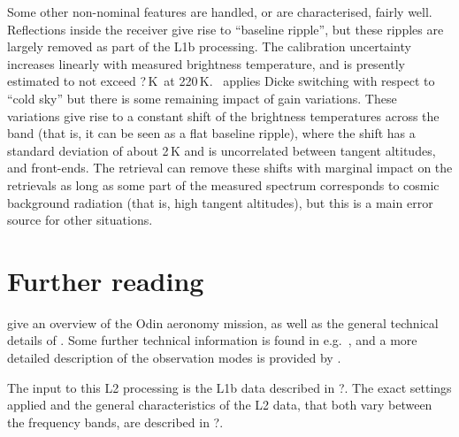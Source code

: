 Some other non-nominal features are handled, or are characterised, fairly
well. Reflections inside the receiver give rise to ``baseline ripple'', but
these ripples are largely removed as part of the L1b processing\addref. The
calibration uncertainty increases linearly with measured brightness
temperature, and is presently estimated to not exceed ?\,K\ at
220\,K. \smr\ applies Dicke switching with respect to ``cold sky'' but there is
some remaining impact of gain variations. These variations give rise to a
constant shift of the brightness temperatures across the band (that is, it can
be seen as a flat baseline ripple), where the shift has a standard deviation of
about 2\,K and is uncorrelated between tangent altitudes, and front-ends. The
retrieval can remove these shifts with marginal impact on the retrievals as
long as some part of the measured spectrum corresponds to cosmic background
radiation (that is, high tangent altitudes), but this is a main error source
for other situations.



\section{Further reading}
\label{sec:reading}
%
\citet{murtagh:anove:02} give an overview of the Odin aeronomy mission, as well
as the general technical details of \smr. Some further technical information
is found in e.g.\ \citet{eriksson:studi:02}, and a more detailed description of
the observation modes is provided by \citet{merino:studi:02}.

The input to this L2 processing is the L1b data described in ?\addref. The
exact settings applied and the general characteristics of the L2 data, that
both vary between the frequency bands, are described in ?\addref.




